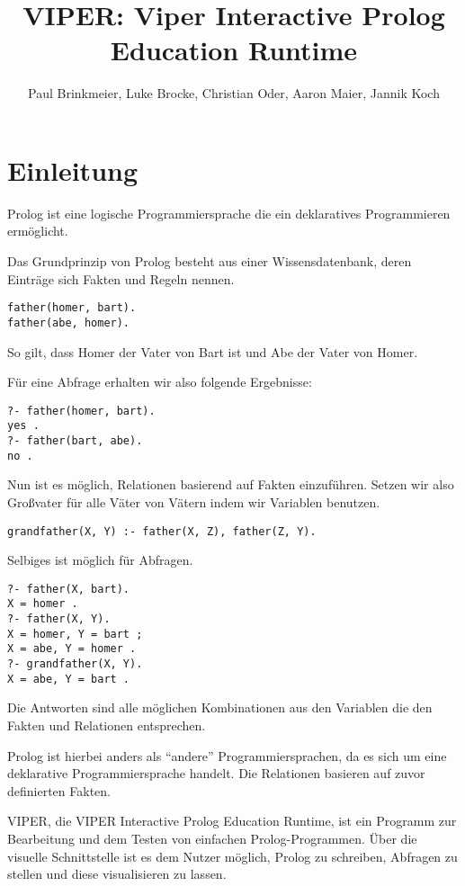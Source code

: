 \documentclass[parskip=full,11pt,twoside]{scrartcl}
\title{VIPER: Viper Interactive Prolog Education Runtime}
\author{Paul Brinkmeier, Luke Brocke, Christian Oder, Aaron Maier, Jannik Koch}
\begin{document}
\maketitle

\section{Einleitung}

Prolog ist eine logische Programmiersprache die ein deklaratives Programmieren ermöglicht.

Das Grundprinzip von Prolog besteht aus einer Wissensdatenbank, deren Einträge sich Fakten und Regeln nennen.

\begin{lstlisting}
father(homer, bart).
father(abe, homer).
\end{lstlisting}

So gilt, dass Homer der Vater von Bart ist und Abe der Vater von Homer.

Für eine Abfrage erhalten wir also folgende Ergebnisse:
\begin{lstlisting}
?- father(homer, bart).
yes .
?- father(bart, abe).
no .
\end{lstlisting}

Nun ist es möglich, Relationen basierend auf Fakten einzuführen. Setzen wir also Großvater für alle Väter von Vätern indem wir Variablen benutzen.
\begin{lstlisting}
grandfather(X, Y) :- father(X, Z), father(Z, Y).
\end{lstlisting}

Selbiges ist möglich für Abfragen.
\begin{lstlisting}
?- father(X, bart).
X = homer .
?- father(X, Y).
X = homer, Y = bart ;
X = abe, Y = homer .
?- grandfather(X, Y).
X = abe, Y = bart .
\end{lstlisting}

Die Antworten sind alle möglichen Kombinationen aus den Variablen die den Fakten und Relationen entsprechen.

Prolog ist hierbei anders als \enquote{andere} Programmiersprachen, da es sich um eine deklarative Programmiersprache handelt. Die Relationen basieren auf zuvor definierten Fakten.

VIPER, die VIPER Interactive Prolog Education Runtime, ist ein Programm zur Bearbeitung und dem Testen von einfachen Prolog-Programmen. Über die visuelle Schnittstelle ist es dem Nutzer möglich, Prolog zu schreiben, Abfragen zu stellen und diese visualisieren zu lassen.
\end{document}
